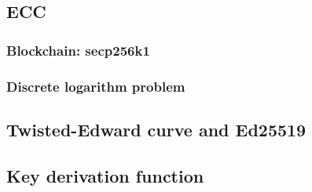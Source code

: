\subsection{ECC}

\subsubsection{Blockchain: secp256k1}

\subsubsection{Discrete logarithm problem}

\subsection{Twisted-Edward curve and Ed25519}

\subsection{Key derivation function}
